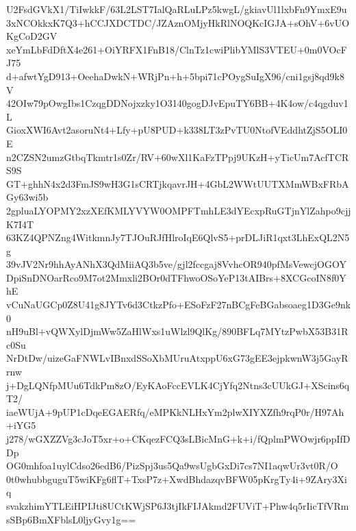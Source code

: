 U2FsdGVkX1/TiIwkkF/63L2LST7IalQaRLuLPz5kwgL/gkiavUl1lxbFn9YmxE9u
3xNCOkkxK7Q3+hCCJXDCTDC/JZAznOMjyHkRlNOQKcIGJA+sOhV+6vUOKgCoD2GV
xeYmLbFdDftX4e261+OiYRFX1FnB18/ClnTz1cwiPlibYMlS3VTEU+0m0VOcFJ75
d+afwtYgD913+OeehaDwkN+WRjPn+h+5bpi71cPOygSuIgX96/cni1gsj8qd9k8V
42OIw79pOwgIbs1CzqgDDNojxzky1O3140gogDJvEpuTY6BB+4K4ow/c4qgduv1L
GioxXWI6Avt2asoruNt4+Lfy+pU8PUD+k338LT3zPvTU0NtofVEddhtZjS5OLI0E
n2CZSN2umzGtbqTkmtr1s0Zr/RV+60wXl1KaFzTPpj9UKzH+yTicUm7AcfTCRS9S
GT+ghhN4x2d3FmJS9wH3G1sCRTjkqavrJH+4GbL2WWtUUTXMmWBxFRbAGy63wi5b
2gpluaLYOPMY2xzXEfKMLYVYW0OMPFTmhLE3dYEcxpRuGTjnYlZahpo9cjjK7I4T
63KZ4QPNZng4WitkmnJy7TJOuRJfHlroIqE6QlvS5+prDLJiR1qxt3LhExQL2N5g
39vJV2Nr9hhAyANhX3QdMiiAQ3b5ve/gjl2fccgaj8VvhcOR940pfMsVewcjOGOY
DpiSnDNOarRco9M7ot2Mmxli2BOr0dTFhwoOSoYeP13tAIBrs+8XCGcoIN8f0YhE
vCuNaUGCp0Z8U41g8JYTv6d3CtkzPfo+ESoFzF27nBCgFeBGabsoaeg1D3Ge9nk0
nH9uBl+vQWXylDjmWw5ZaHlWxs1uWlzl9QlKg/890BFLq7MYtzPwbX53B31Rc0Su
NrDtDw/uizeGaFNWLvIBnxdSSoXbMUruAtxppU6xG73gEE3ejpkwnW3j5GayRrnw
j+DgLQNfpMUu6TdkPm8zO/EyKAoFccEVLK4CjYfq2Ntns3cUUkGJ+XScins6qT2/
iaeWUjA+9pUP1cDqeEGAERfq/eMPKkNLHxYm2plwXIYXZfh9rqP0r/H97Ah+iYG5
j278/wGXZZVg3cJoT5xr+o+CKqezFCQ3sLBicMnG+k+i/fQplmPWOwjr6ppIfDDp
OG0mhfoa1uylCdso26edB6/PizSpj3us5Qa9wsUgbGxDi7cs7NI1aqwUr3vt0R/O
0t0whubbguguT5wiKFg6flT+TxsP7z+XwdBhdazqvBFW05pKrgTy4i+9ZAry3Xiq
svakzhimYTLEiHPIJti8UCtKWjSP6J3tjIkFIJAkmd2FUViT+Phw4q5rIicTfVRm
sSBp6BmXFblsL0ljyGvy1g==
